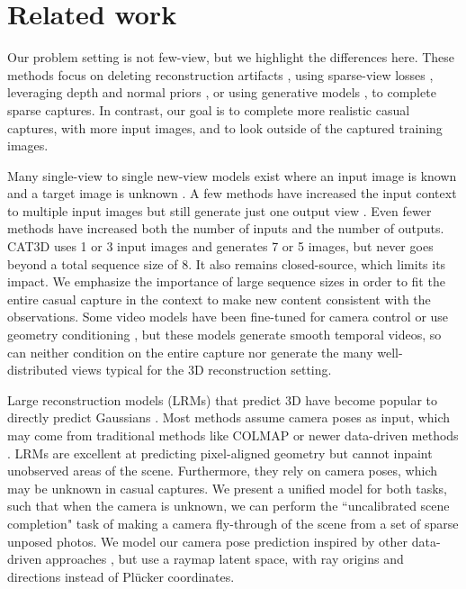 \section{Related work}
\label{sec:related_work}
\vspace{-0.5em}

Our problem setting is not few-view, but we highlight the differences here.
These methods focus on deleting reconstruction artifacts \cite{warburg2023nerfbusters,sabour2024spotlesssplats,goli2024bayes}, using sparse-view losses \cite{niemeyer2022regnerf}, leveraging depth and normal priors \cite{TurkuRMSRK2025}, or using generative models \cite{wu2024reconfusion,LiuCKTT2024,KantSVGRTG2023}, to complete sparse captures.
In contrast, our goal is to complete more realistic casual captures, with more input images, and to look outside of the captured training images.

Many single-view to single new-view models exist where an input image is known and a target image is unknown \cite{liu2023zero,sargent2023zeronvs,seo2024genwarp,tewari2023diffusion}.
A few methods have increased the input context to multiple input images but still generate just one output view \cite{wu2024reconfusion,jin2024lvsm}.
Even fewer methods have increased both the number of inputs and the number of outputs.
CAT3D \cite{gao2024cat3d} uses 1 or 3 input images and generates 7 or 5 images, but never goes beyond a total sequence size of 8.
It also remains closed-source, which limits its impact.
We emphasize the importance of large sequence sizes in order to fit the entire casual capture in the context to make new content consistent with the observations.
Some video models have been fine-tuned for camera control \cite{he2024cameractrl,wang2024motionctrl,VanHWOSLTDZV2024} or use geometry conditioning \cite{yu2024viewcrafter,liu2024reconx,muller2024multidiff,MVDiffusion}, but these models generate smooth temporal videos, so can neither condition on the entire capture nor generate the many well-distributed views typical for the 3D reconstruction setting.

Large reconstruction models (LRMs) that predict 3D have become popular to directly predict Gaussians \cite{xu2024grm,ZiwenTZBLHFX2024}.
Most methods assume camera poses as input, which may come from traditional methods like COLMAP \cite{schonberger2016structure} or newer data-driven methods \cite{wang2024dust3r,leroy2024grounding}.
LRMs are excellent at predicting pixel-aligned geometry but cannot inpaint unobserved areas of the scene.
Furthermore, they rely on camera poses, which may be unknown in casual captures.
We present a unified model for both tasks, such that when the camera is unknown, we can perform the ``uncalibrated scene completion" task of making a camera fly-through of the scene from a set of sparse unposed photos.
We model our camera pose prediction inspired by other data-driven approaches \cite{zhang2024cameras}, but use a raymap latent space, with ray origins and directions instead of Plücker coordinates.

